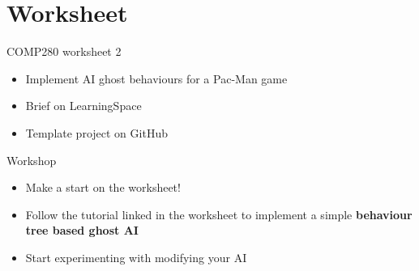\part{Worksheet}
\frame{\partpage}

\begin{frame}{COMP280 worksheet 2}
	\begin{itemize}
		\pause\item Implement AI ghost behaviours for a Pac-Man game
		\pause\item Brief on LearningSpace
		\pause\item Template project on GitHub
	\end{itemize}
\end{frame}

\begin{frame}{Workshop}
	\begin{itemize}
		\item Make a start on the worksheet!
		\item Follow the tutorial linked in the worksheet to implement a simple \textbf{behaviour tree based ghost AI}
		\item Start experimenting with modifying your AI
	\end{itemize}
\end{frame}


